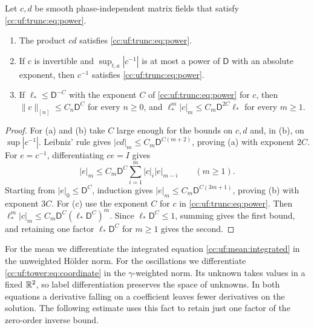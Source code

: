 \begin{lemma}\label{cc:uf:trunc:lem:coefficients}
Let $c,d$ be smooth phase-independent matrix fields that satisfy
\eqref{cc:uf:trunc:eq:power}.
\begin{enumerate}[label=(\alph*),leftmargin=*]
\item The product $cd$ satisfies \eqref{cc:uf:trunc:eq:power}.
\item If $c$ is invertible and $\sup_{t,a}|c^{-1}|$ is at most a power
of $\mathsf D$ with an absolute exponent, then $c^{-1}$ satisfies
\eqref{cc:uf:trunc:eq:power}.
\item If $\ell_*\le\mathsf D^{-C}$ with the exponent $C$ of
\eqref{cc:uf:trunc:eq:power} for $c$, then
$\|c\|_{[n]}\le C_n\mathsf D^C$ for every $n\ge0$, and
$\ell_*^m|c|_m\le C_m\mathsf D^{2C}\ell_*$ for every $m\ge1$.
\end{enumerate}
\end{lemma}
\begin{proof}
For (a) and (b) take $C$ large enough for the bounds on $c,d$ and,
in (b), on $\sup|c^{-1}|$. Leibniz' rule gives
$|cd|_m\le C_m\mathsf D^{C(m+2)}$, proving (a) with exponent $2C$.
For $e=c^{-1}$, differentiating $ce=I$ gives
\[
 |e|_m\le
 C_m\mathsf D^C\sum_{i=1}^m|c|_i|e|_{m-i}\qquad(m\ge1).
\]
Starting from $|e|_0\le\mathsf D^C$, induction gives
$|e|_m\le C_m\mathsf D^{C(3m+1)}$, proving (b) with exponent $3C$.
For (c) use the exponent $C$ for $c$ in \eqref{cc:uf:trunc:eq:power}.
Then $\ell_*^m|c|_m\le C_m\mathsf D^C(\ell_*\mathsf D^C)^m$.
Since $\ell_*\mathsf D^C\le1$, summing gives the first bound, and
retaining one factor $\ell_*\mathsf D^C$ for $m\ge1$ gives the second.
\end{proof}

For the mean we differentiate the integrated equation
\eqref{cc:uf:mean:integrated} in the unweighted H\"older norm. For
the oscillations we differentiate \eqref{cc:uf:tower:eq:coordinate}
in the $\gamma$-weighted norm. Its unknown takes values in a fixed
$\mathbb R^2$, so label differentiation preserves the space of unknowns.
In both equations a derivative falling on a coefficient leaves fewer
derivatives on the solution. The following estimate uses this fact to
retain just one factor of the zero-order inverse bound.

